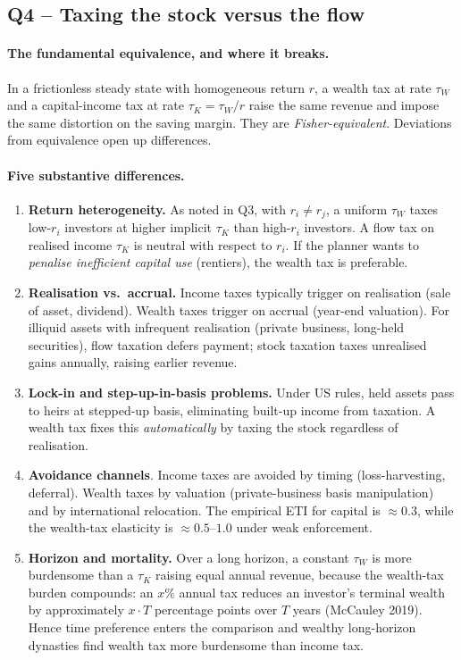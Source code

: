 \documentclass[11pt,a4paper]{article}
\begin{document}
\subsection*{Q4 -- Taxing the stock versus the flow}

\paragraph{The fundamental equivalence, and where it breaks.}
In a frictionless steady state with homogeneous return $r$, a wealth tax at rate $\tau_{W}$ and a capital-income tax at rate $\tau_{K}=\tau_{W}/r$ raise the same revenue and impose the same distortion on the saving margin. They are \emph{Fisher-equivalent}. Deviations from equivalence open up differences.

\paragraph{Five substantive differences.}
\begin{enumerate}[leftmargin=*,itemsep=2pt]
    \item \textbf{Return heterogeneity.} As noted in Q3, with $r_{i}\ne r_{j}$, a uniform $\tau_{W}$ taxes low-$r_{i}$ investors at higher implicit $\tau_{K}$ than high-$r_{i}$ investors. A flow tax on realised income $\tau_{K}$ is neutral with respect to $r_{i}$. If the planner wants to \emph{penalise inefficient capital use} (rentiers), the wealth tax is preferable.
    \item \textbf{Realisation vs.\ accrual.} Income taxes typically trigger on realisation (sale of asset, dividend). Wealth taxes trigger on accrual (year-end valuation). For illiquid assets with infrequent realisation (private business, long-held securities), flow taxation defers payment; stock taxation taxes unrealised gains annually, raising earlier revenue.
    \item \textbf{Lock-in and step-up-in-basis problems.} Under US rules, held assets pass to heirs at stepped-up basis, eliminating built-up income from taxation. A wealth tax fixes this \emph{automatically} by taxing the stock regardless of realisation.
    \item \textbf{Avoidance channels}. Income taxes are avoided by timing (loss-harvesting, deferral). Wealth taxes by valuation (private-business basis manipulation) and by international relocation. The empirical ETI for capital is $\approx 0.3$, while the wealth-tax elasticity is $\approx 0.5$--$1.0$ under weak enforcement.
    \item \textbf{Horizon and mortality.} Over a long horizon, a constant $\tau_{W}$ is more burdensome than a $\tau_{K}$ raising equal annual revenue, because the wealth-tax burden compounds: an $x\%$ annual tax reduces an investor's terminal wealth by approximately $x\cdot T$ percentage points over $T$ years (McCauley 2019). Hence time preference enters the comparison and wealthy long-horizon dynasties find wealth tax more burdensome than income tax.
\end{enumerate}
\end{document}
